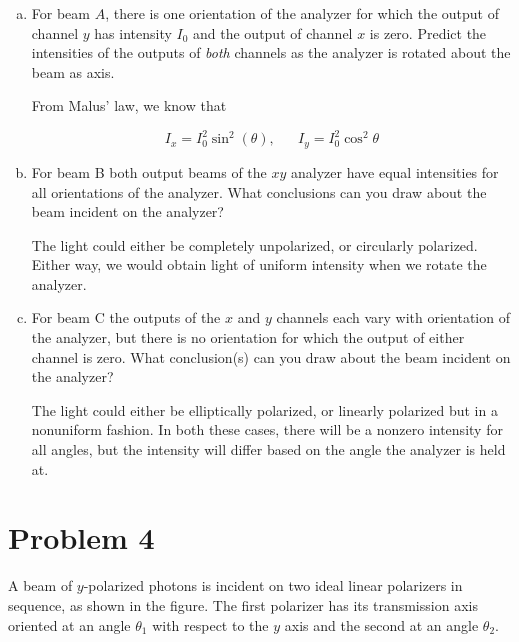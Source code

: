 \documentclass[10pt]{article}
\begin{document}
    \begin{enumerate}[(a)]
        \item For beam $A$, there is one orientation of the analyzer for which the output of channel $y$ has intensity $I_0$ and the output of channel $x$ is zero. Predict the intensities of the outputs of \textit{both} channels as the analyzer is rotated about the beam as axis.
        
        \begin{solution}
            From Malus' law, we know that 

            \[ I_x = I_0^2 \sin^2(\theta), \phantom{aaa} I_y = I_0^2 \cos^2 \theta\]
        \end{solution}
        \item For beam B both output beams of the $xy$ analyzer have equal intensities for all orientations of the analyzer. What conclusions can you draw about the beam incident on the analyzer? 
        
        \begin{solution}
            The light could either be completely unpolarized, or circularly polarized. Either way, we would obtain light of uniform intensity when we rotate the analyzer. 
        \end{solution}
        \item For beam C the outputs of the $x$ and $y$ channels each vary with orientation of the analyzer, but there is no orientation for which the output of either channel is zero. What conclusion(s) can you draw about the beam incident on the analyzer?
        
        \begin{solution}
            The light could either be elliptically polarized, or linearly polarized but in a nonuniform fashion. In both these cases, there will be a nonzero intensity for all angles, but the intensity will differ based on the angle the analyzer is held at.
        \end{solution}
    \end{enumerate}

    \pagebreak 

    \section*{Problem 4} 
    A beam of $y$-polarized photons is incident on two ideal linear polarizers in sequence, as shown in the figure. The first polarizer has its transmission axis oriented at an angle $\theta_1$ with respect to the $y$ axis and the second at an angle $\theta_2$. 
\end{document}
